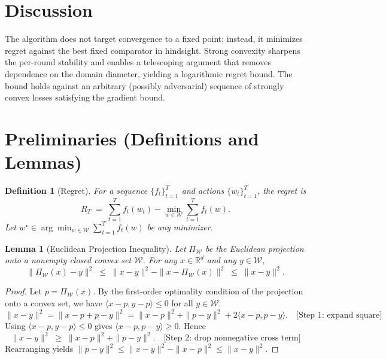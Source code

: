 \documentclass[12pt]{article}
\newtheorem{lemma}{Lemma}
\newtheorem{definition}{Definition}
\begin{document}
\section*{Discussion}
The algorithm does not target convergence to a fixed point; instead, it minimizes regret against the best fixed comparator in hindsight. Strong convexity sharpens the per-round stability and enables a telescoping argument that removes dependence on the domain diameter, yielding a logarithmic regret bound. The bound holds against an arbitrary (possibly adversarial) sequence of strongly convex losses satisfying the gradient bound.

\section*{Preliminaries (Definitions and Lemmas)}
\begin{definition}[Regret]
For a sequence $\{f_t\}_{t=1}^T$ and actions $\{w_t\}_{t=1}^T$, the regret is
\[
R_T \;=\; \sum_{t=1}^T f_t(w_t) - \min_{w\in \mathcal{W}} \sum_{t=1}^T f_t(w).
\]
Let $w^\star\in\arg\min_{w\in \mathcal{W}} \sum_{t=1}^T f_t(w)$ be any minimizer.
\end{definition}

\begin{lemma}[Euclidean Projection Inequality]
Let $\Pi_{\mathcal{W}}$ be the Euclidean projection onto a nonempty closed convex set $\mathcal{W}$. For any $x\in\mathbb{R}^d$ and any $y\in \mathcal{W}$,
\[
\|\Pi_{\mathcal{W}}(x)-y\|^2 \;\le\; \|x-y\|^2 - \|x-\Pi_{\mathcal{W}}(x)\|^2 \;\le\; \|x-y\|^2.
\]
\end{lemma}
\begin{proof}
Let $p=\Pi_{\mathcal{W}}(x)$. By the first-order optimality condition of the projection onto a convex set, we have $\langle x-p, y-p\rangle \le 0$ for all $y\in \mathcal{W}$.
\[
\|x-y\|^2 = \|x-p+p-y\|^2 = \|x-p\|^2 + \|p-y\|^2 + 2\langle x-p, p-y\rangle. \quad \text{[Step 1: expand square]}
\]
Using $\langle x-p, y-p\rangle \le 0$ gives $\langle x-p, p-y\rangle \ge 0$. Hence
\[
\|x-y\|^2 \;\ge\; \|x-p\|^2 + \|p-y\|^2. \quad \text{[Step 2: drop nonnegative cross term]}
\]
Rearranging yields $\|p-y\|^2 \le \|x-y\|^2 - \|x-p\|^2 \le \|x-y\|^2$. \quad {}
\end{proof}
\end{document}
